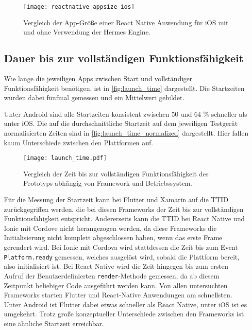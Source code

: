 \begin{figure}[ht]
  \centering 
  \texttt{[image: reactnative\_appsize\_ios]}
   \caption{Vergleich der App-Größe einer React Native Anwendung für iOS mit und ohne Verwendung der Hermes Engine.}
  \label{fig:reactnative_appsize_ios}
\end{figure}


\subsection{Dauer bis zur vollständigen Funktionsfähigkeit}

Wie lange die jeweiligen Apps zwischen Start und vollständiger Funktionsfähigkeit benötigen, ist in \autoref{fig:launch_time} dargestellt.
Die Startzeiten wurden dabei fünfmal gemessen und ein Mittelwert gebildet.

Unter Android sind alle Startzeiten konsistent zwischen 50 und 64 \% schneller als unter iOS.
Die auf die durchschnittliche Startzeit auf dem jeweiligen Testgerät normalisierten Zeiten sind in \autoref{fig:launch_time_normalized} dargestellt.
Hier fallen kaum Unterschiede zwischen den Plattformen auf.
\begin{figure}[ht]
  \centering 
  \texttt{[image: launch\_time.pdf]}
  \caption{Vergleich der Zeit bis zur vollständigen Funktionsfähigkeit des Prototyps abhängig von Framework und Betriebssystem.}
  \label{fig:launch_time}
\end{figure}


Für die Messung der Startzeit kann bei Flutter und Xamarin auf die \ac{TTID} zurückgegriffen werden, die bei diesen Frameworks der Zeit bis zur vollständigen Funktionsfähigkeit entspricht.
Andererseits kann die \ac{TTID} bei React Native und Ionic mit Cordove nicht herangezogen werden, da diese Frameworks die Initialisierung nicht komplett abgeschlossen haben, wenn das erste Frame gerendert wird.
Bei Ionic mit Cordova wird stattdessen die Zeit bis zum Event \texttt{Platform.ready} gemessen, welches ausgelöst wird, sobald die Plattform bereit, also initialisiert ist.
Bei React Native wird die Zeit hingegen bis zum ersten Aufruf der Benutzerdefinierten \texttt{render}-Methode gemessen, da ab diesem Zeitpunkt beliebiger Code ausgeführt werden kann.
Von allen untersuchten Frameworks starten Flutter und React-Native Anwendungen am schnellsten.
Unter Android ist Flutter dabei etwas schneller als React Native, unter iOS ist es umgekehrt.
Trotz große konzeptueller Unterschiede zwischen den Frameworks ist eine ähnliche Startzeit erreichbar.

